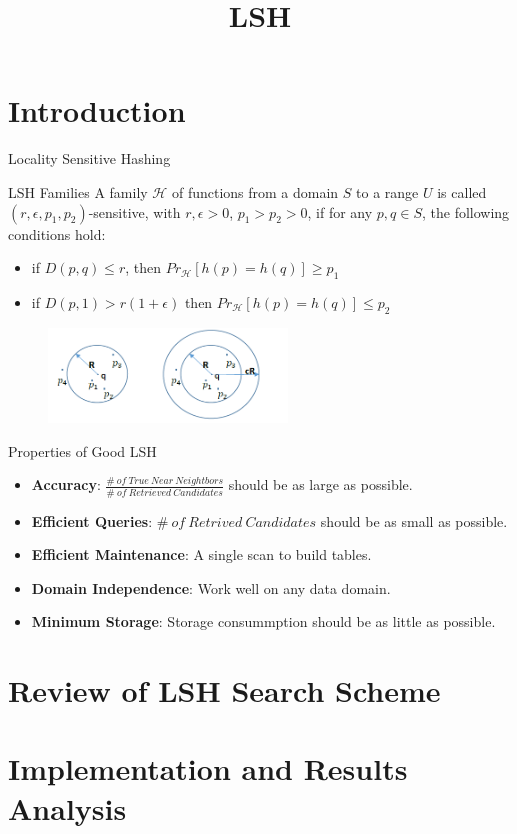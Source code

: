 \documentclass{beamer}
\title{LSH}
\begin{document}
	\maketitle
	\section{Introduction}
	\begin{frame}{Locality Sensitive Hashing}
	\begin{block}{LSH Families}
		A family $\mathcal{H}$ of functions from a domain $S$ to a range $U$ is called $(r, \epsilon, p_1, p_2)$-sensitive, with $r, \epsilon>0$, $p_1>p_2>0$, if for any $p, q\in S$, the following conditions hold:
		\begin{itemize}
			\item if $D(p, q)\leq r$, then $Pr_{\mathcal{H}}[h(p)=h(q)]\geq p_1$
			\item if $D(p, 1)>r(1+\epsilon)$ then $Pr_{\mathcal{H}}[h(p)=h(q)]\leq p_2$
		\end{itemize}
	\end{block}
	\begin{figure}
		\includegraphics[width=2.5in]{figures/intro_lsh.png}
	\end{figure}
	\end{frame}
	
	\begin{frame}{Properties of Good LSH}
	\small
		\begin{itemize}
			\item \textbf{Accuracy}: $\frac{\#\ of\ True\ Near\ Neightbors}{\#\ of\ Retrieved\ Candidates}$ should be as large as possible.
			\vspace{2ex}
			\item\textbf{Efficient Queries}: \small{$\#\ of\ Retrived\ Candidates$} should be as small as possible.
			\vspace{2ex}
			\item \textbf{Efficient Maintenance}: A single scan to build tables.
			\vspace{2ex}
			\item \textbf{Domain Independence}: Work well on any data domain.
			\vspace{2ex}
			\item \textbf{Minimum Storage}: Storage consummption should be as little as possible.
		\end{itemize}
	\end{frame}


	\section{Review of LSH Search Scheme}
	
	
	
	
	\section{Implementation and Results Analysis}
	\begin{frame}[allowframebreaks]
	
	
	\end{frame}
\end{document}
